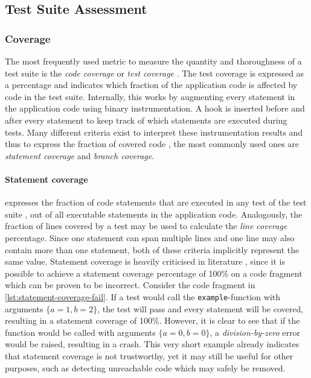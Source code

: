 
\subsection{Test Suite Assessment}

\subsubsection{Coverage}
\noindent The most frequently used metric to measure the quantity and thoroughness of a test suite is the \emph{code coverage} or \emph{test coverage} \cite[p.~467]{8016712}. The test coverage is expressed as a percentage and indicates which fraction of the application code is affected by code in the test suite. Internally, this works by augmenting every statement in the application code using binary instrumentation. A hook is inserted before and after every statement to keep track of which statements are executed during tests. Many different criteria exist to interpret these instrumentation results and thus to express the fraction of covered code \cite{Myers:2011:AST:2161638}, the most commonly used ones are \emph{statement coverage} and \emph{branch coverage}.

\paragraph*{Statement coverage} expresses the fraction of code statements that are executed in any test of the test suite \cite{6588537}, out of all executable statements in the application code. Analogously, the fraction of lines covered by a test may be used to calculate the \emph{line coverage} percentage. Since one statement can span multiple lines and one line may also contain more than one statement, both of these criteria implicitly represent the same value. Statement coverage is heavily criticised in literature \cite[p.~37]{Myers:2011:AST:2161638}, since it is possible to achieve a statement coverage percentage of 100\% on a code fragment which can be proven to be incorrect. Consider the code fragment in \autoref{lst:statement-coverage-fail}. If a test would call the \texttt{example}-function with arguments $\{a = 1, b = 2\}$, the test will pass and every statement will be covered, resulting in a statement coverage of 100\%. However, it is clear to see that if the function would be called with arguments $\{a = 0, b = 0\}$, a \emph{division-by-zero} error would be raised, resulting in a crash. This very short example already indicates that statement coverage is not trustworthy, yet it may still be useful for other purposes, such as detecting unreachable code which may safely be removed.


